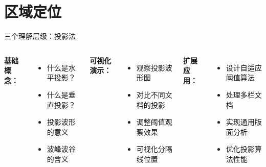 
\section{区域定位}

\begin{frame}{三个理解层级：投影法}
    \begin{columns}
        \textbf{基础概念：}
        \begin{itemize}
            \item 什么是水平投影？
            \item 什么是垂直投影？
            \item 投影波形的意义
            \item 波峰波谷的含义
        \end{itemize}

        \textbf{可视化演示：}
        \begin{itemize}
            \item 观察投影波形图
            \item 对比不同文档的投影
            \item 调整阈值观察效果
            \item 可视化分隔线位置
        \end{itemize}

        \textbf{扩展应用：}
        \begin{itemize}
            \item 设计自适应阈值算法
            \item 处理多栏文档
            \item 实现通用版面分析
            \item 优化投影算法性能
        \end{itemize}
    \end{columns}
\end{frame}

